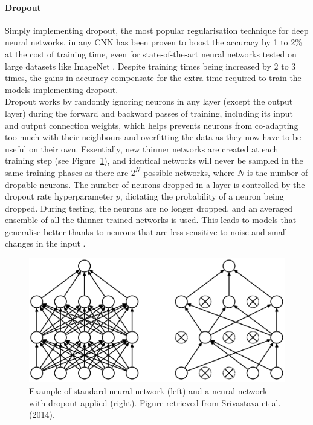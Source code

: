 \paragraph{Dropout}

Simply implementing dropout, the most popular regularisation technique for deep neural networks, in any CNN has been proven to boost the accuracy by 1 to 2\% \citep{Geron2019} at the cost of training time, even for state-of-the-art neural networks tested on large datasets like ImageNet \citep{Srivastava2014}. Despite training times being increased by 2 to 3 times, the gains in accuracy compensate for the extra time required to train the models implementing dropout.\\

Dropout works by randomly ignoring neurons in any layer (except the output layer) during the forward and backward passes of training, including its input and output connection weights, which helps prevents neurons from co-adapting too much with their neighbours and overfitting the data as they now have to be useful on their own. Essentially, new thinner networks are created at each training step (see Figure~\ref{fig:litsurvey-dropout}), and identical networks will never be sampled in the same training phases as there are $2^N$ possible networks, where $N$ is the number of dropable neurons. The number of neurons dropped in a layer is controlled by the dropout rate hyperparameter $p$, dictating the probability of a neuron being dropped. During testing, the neurons are no longer dropped, and an averaged ensemble of all the thinner trained networks is used. This leads to models that generalise better thanks to neurons that are less sensitive to noise and small changes in the input \citep{Srivastava2014}.

\begin{figure}[ht]
\centerline{\includegraphics[width=\textwidth]{figures/litsurvey/dropout.png}}
\caption{\label{fig:litsurvey-dropout}Example of standard neural network (left) and a neural network with dropout applied (right). Figure retrieved from Srivastava et al. (2014).}
\end{figure}

